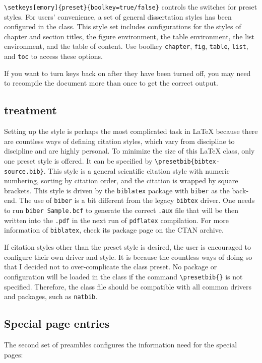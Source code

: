 \documentclass[final]{emory}
\begin{document}
\Verb|\setkeys[emory]{preset}{boolkey=true/false}| controls the switches for preset styles.
For users' convenience, a set of general dissertation styles has been configured in the class. 
This style set includes configurations for the styles of chapter and section 
titles, the figure environment, the table environment, the list environment, 
and the table of content. Use boolkey \Verb|chapter|, \Verb|fig|, \Verb|table|, 
\Verb|list|, and \Verb|toc| to access these options.

If you want to turn keys back on after they have been turned off, you may need 
to recompile the document more than once to get the correct output.

\subsection{{\BibTeX{}} treatment}
Setting up the \BibTeX{} style is perhaps the most complicated task in \LaTeX{} 
because there are countless ways of defining citation styles, which vary from 
discipline to discipline and are highly personal.
To minimize the size of this \LaTeX{} class, only one preset \BibTeX{} style
is offered. It can be specified by \Verb|\presetbib{bibtex-source.bib}|.
This style is a general scientific citation style with numeric numbering, 
sorting by citation order, and the citation is wrapped by square brackets. 
This style is driven by the \Verb|biblatex| package with \Verb|biber| as the 
back-end. 
The use of \Verb|biber| is a bit different from the legacy \Verb|bibtex| driver.
One needs to run \Verb|biber Sample.bcf| to generate the correct \Verb|.aux| 
file that will be then written into the \Verb|.pdf| in the next run of 
\Verb|pdflatex| compilation. For more information of \Verb|biblatex|, check its 
package page on the CTAN archive. 

If citation styles other than the preset style is desired, the user is 
encouraged to configure their own \BibTeX{} driver and style.
It is because the countless ways of doing so that I decided not to 
over-complicate the class preset.
No \BibTeX{} package or configuration will be loaded in the class if the 
command \Verb|\presetbib{}| is not specified. 
Therefore, the class file should be compatible with all common \BibTeX{} 
drivers and packages, such as \Verb|natbib|. 


\subsection{Special page entries}
The second set of preambles configures the information need for the special pages:
\end{document}
